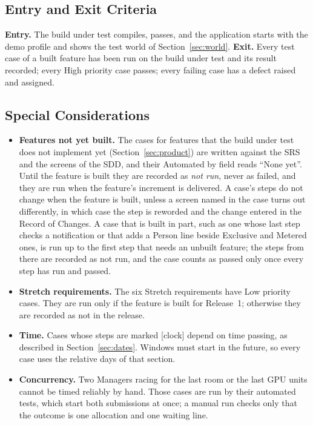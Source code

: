 \subsection{Entry and Exit Criteria}
\textbf{Entry.} The build under test compiles,  passes, and the application starts with the demo profile and shows the test world of Section~\ref{sec:world}. \textbf{Exit.} Every test case of a built feature has been run on the build under test and its result recorded; every High priority case passes; every failing case has a defect raised and assigned.

\subsection{Special Considerations}\label{sec:special}
\begin{itemize}
  \item \textbf{Features not yet built.} The cases for features that the build under test does not implement yet (Section~\ref{sec:product}) are written against the SRS and the screens of the SDD, and their Automated by field reads ``None yet''. Until the feature is built they are recorded as \emph{not run}, never as failed, and they are run when the feature's increment is delivered. A case's steps do not change when the feature is built, unless a screen named in the case turns out differently, in which case the step is reworded and the change entered in the Record of Changes. A case that is built in part, such as one whose last step checks a notification or that adds a Person line beside Exclusive and Metered ones, is run up to the first step that needs an unbuilt feature; the steps from there are recorded as not run, and the case counts as passed only once every step has run and passed.
  \item \textbf{Stretch requirements.} The six Stretch requirements have Low priority cases. They are run only if the feature is built for Release~1; otherwise they are recorded as not in the release.
  \item \textbf{Time.} Cases whose steps are marked [clock] depend on time passing, as described in Section~\ref{sec:dates}. Windows must start in the future, so every case uses the relative days of that section.
  \item \textbf{Concurrency.} Two Managers racing for the last room or the last GPU units cannot be timed reliably by hand. Those cases are run by their automated tests, which start both submissions at once; a manual run checks only that the outcome is one allocation and one waiting line.

\end{itemize}
